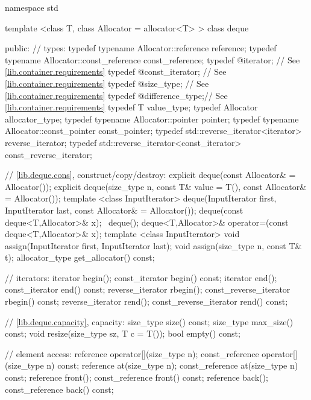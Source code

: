 \begin{codeblock}
namespace std {
  template <class T, class Allocator = allocator<T> >
  class deque {
  public:
    // types:
    typedef typename Allocator::reference         reference;
    typedef typename Allocator::const_reference   const_reference;
    typedef @\impdef@                iterator;       // See \ref{lib.container.requirements}
    typedef @\impdef@                const_iterator; // See \ref{lib.container.requirements}
    typedef @\impdef@                size_type;      // See \ref{lib.container.requirements}
    typedef @\impdef@                difference_type;// See \ref{lib.container.requirements}
    typedef T                                     value_type;
    typedef Allocator                             allocator_type;
    typedef typename Allocator::pointer           pointer;
    typedef typename Allocator::const_pointer     const_pointer;
    typedef std::reverse_iterator<iterator>       reverse_iterator;
    typedef std::reverse_iterator<const_iterator> const_reverse_iterator;

    // \ref{lib.deque.cons}, construct/copy/destroy:
    explicit deque(const Allocator& = Allocator());
    explicit deque(size_type n, const T& value = T(),
        const Allocator& = Allocator());
    template <class InputIterator>
      deque(InputIterator first, InputIterator last,
            const Allocator& = Allocator());
    deque(const deque<T,Allocator>& x);
   ~deque();
    deque<T,Allocator>& operator=(const deque<T,Allocator>& x);
    template <class InputIterator>
      void assign(InputIterator first, InputIterator last);
    void assign(size_type n, const T& t);
    allocator_type get_allocator() const;

    // iterators:
    iterator               begin();
    const_iterator         begin() const;
    iterator               end();
    const_iterator         end() const;
    reverse_iterator       rbegin();
    const_reverse_iterator rbegin() const;
    reverse_iterator       rend();
    const_reverse_iterator rend() const;

    // \ref{lib.deque.capacity}, capacity:
    size_type size() const;
    size_type max_size() const;
    void      resize(size_type sz, T c = T());
    bool      empty() const;

    // element access:
    reference       operator[](size_type n);
    const_reference operator[](size_type n) const;
    reference       at(size_type n);
    const_reference at(size_type n) const;
    reference       front();
    const_reference front() const;
    reference       back();
    const_reference back() const;

}}
\end{codeblock}
